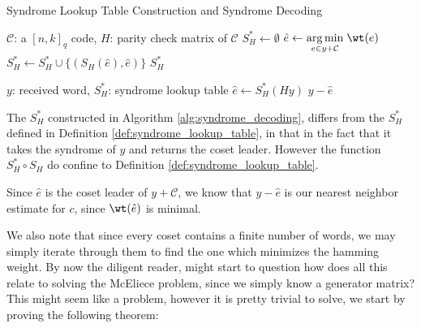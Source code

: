 \begin{algorithm}[H]
\caption{Syndrome Lookup Table Construction and Syndrome Decoding}\label{alg:syndrome_decoding}
\begin{algorithmic}
   {$\mathcal{C}$: a $[n,k]_q$ code, $H$: parity check matrix of $\mathcal{C}$}
  \State $S_H^{*} \gets \emptyset$
     \State $\hat{e} \gets \underset{e \in y + \mathcal{C}}{\arg \min} \; \wt(e)$
     \State $S_H^{*} \gets S_H^{*} \cup \{(S_H(\hat{e}), \hat{e})\}$
  \EndFor
  \State \Return $S_H^{*}$ 
  \EndProcedure
  \newline

   {$y$: received word, $S_{H}^{*}$: syndrome lookup table}
    \State $\hat{e} \gets S_H^{*}(Hy)$
    \State \Return $y - \hat{e}$
  \EndProcedure
\end{algorithmic}
\end{algorithm}
\begin{remark}
The $S^*_H$ constructed in Algorithm \ref{alg:syndrome_decoding}, differs from the $S_H^{*}$ defined in Definition \ref{def:syndrome_lookup_table}, in that in the fact that it takes the syndrome of $y$ and returns the coset leader. However the function $S_H^{*} \circ S_H$ do confine to Definition \ref{def:syndrome_lookup_table}.
\end{remark}
\begin{remark}
  Since $\hat{e}$ is the coset leader of $y + \mathcal{C}$, we know that $y - \hat{e}$ is our nearest neighbor estimate for $c$, since $\wt(\hat{e})$ is minimal.
\end{remark}
We also note that since every coset contains a finite number of words, we may simply iterate through them to find the one which minimizes the hamming weight. By now the diligent reader, might start to question how does all this relate to solving the McEliece problem, since we simply know a generator matrix? This might seem like a problem, however it is pretty trivial to solve, we start by proving the following theorem:

